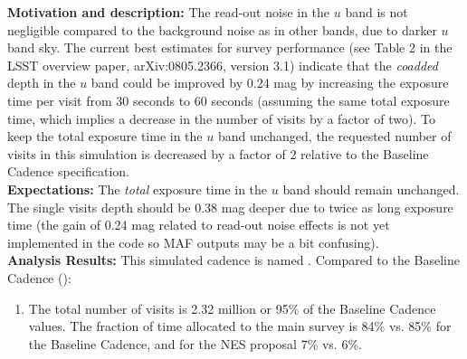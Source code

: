 

{\bf Motivation and description:} The read-out noise in the $u$ band is
not negligible compared to the background noise as in other bands, due
to darker $u$ band sky. The current best estimates for survey
performance (see Table 2 in the LSST overview paper, arXiv:0805.2366,
version 3.1) indicate that the {\it coadded} depth in the $u$ band
could be improved by 0.24 mag by increasing the exposure time per
visit from 30 seconds to 60 seconds
(assuming the same total exposure time, which implies a
decrease in the number of visits by a factor of two). To keep the
total exposure time in the $u$ band unchanged, the requested number of
visits in this simulation is decreased by a factor of 2 relative to the
Baseline Cadence specification. \\

{\bf Expectations:} The {\it total} exposure time in the $u$ band should
remain unchanged. The single visits depth should be 0.38 mag deeper
due to twice as long exposure time (the gain of 0.24 mag related to
read-out noise effects is not yet implemented in the \OpSim code so MAF
outputs may be a bit confusing). \\

{\bf Analysis Results:} This simulated cadence is named .  Compared
to the Baseline Cadence ():
\begin{enumerate}
\item The total number of visits is 2.32 million or 95\% of the
Baseline Cadence values. The fraction of time allocated to the main
survey is 84\% vs. 85\% for the Baseline Cadence, and for the NES
proposal 7\% vs. 6\%. %
\end{enumerate}

